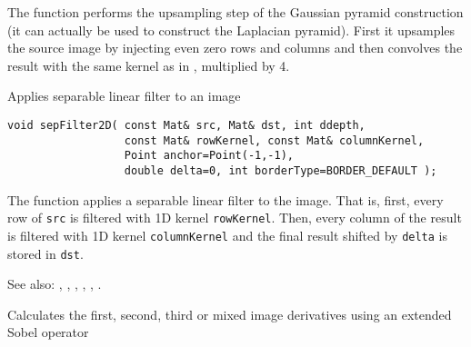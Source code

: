 The function performs the upsampling step of the Gaussian pyramid construction (it can actually be used to construct the Laplacian pyramid). First it upsamples the source image by injecting even zero rows and columns and then convolves the result with the same kernel as in , multiplied by 4.

Applies separable linear filter to an image

\begin{lstlisting}
void sepFilter2D( const Mat& src, Mat& dst, int ddepth,
                  const Mat& rowKernel, const Mat& columnKernel,
                  Point anchor=Point(-1,-1),
                  double delta=0, int borderType=BORDER_DEFAULT );
\end{lstlisting}
\begin{description}
\end{description}

The function applies a separable linear filter to the image. That is, first, every row of \texttt{src} is filtered with 1D kernel \texttt{rowKernel}. Then, every column of the result is filtered with 1D kernel \texttt{columnKernel} and the final result shifted by \texttt{delta} is stored in \texttt{dst}.

See also: , , , , , .

Calculates the first, second, third or mixed image derivatives using an extended Sobel operator


